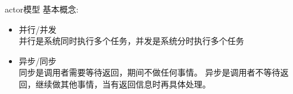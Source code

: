 \documentclass[UTF8]{ctexbeamer}
\begin{document}
\begin{frame}{actor模型}
  基本概念: 
  \begin{itemize}
  \item 并行/并发 \\
    并行是系统同时执行多个任务，并发是系统分时执行多个任务
  \item 异步/同步 \\
    同步是调用者需要等待返回，期间不做任何事情。
    异步是调用者不等待返回，继续做其他事情，当有返回信息时再具体处理。
  \end{itemize}
\end{frame}
\end{document}
